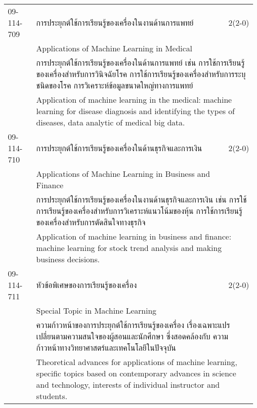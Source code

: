 \begin{longtable}{p{}p{}r{}}
09-114-709 & การประยุกต์ใช้การเรียนรู้ของเครื่องในงานด้านการแพทย์  & 2(2-0)\\*
 & Applications of Machine Learning in Medical & \phantom{x} \vspace{3mm} \\*
&  \multicolumn{2}{p{0.75\textwidth}}{การประยุกต์ใช้การเรียนรู้ของเครื่องในด้านการแพทย์ เช่น การใช้การเรียนรู้ของเครื่องสำหรับการวินิจฉัยโรค การใช้การเรียนรู้ของเครื่องสำหรับการระบุชนิดของโรค การวิเคราะห์ข้อมูลขนาดใหญ่ทางการแพทย์} \vspace{3mm} \\*
&  \multicolumn{2}{p{0.75\textwidth}}{Application of machine learning in the medical: machine learning for disease diagnosis and identifying the types of diseases, data analytic of medical big data.} \vspace{8mm} \\*
09-114-710 & การประยุกต์ใช้การเรียนรู้ของเครื่องในด้านธุรกิจและการเงิน & 2(2-0)\\*
 & Applications of Machine Learning in Business and Finance & \phantom{x} \vspace{3mm} \\*
&  \multicolumn{2}{p{0.75\textwidth}}{การประยุกต์ใช้การเรียนรู้ของเครื่องในงานด้านธุรกิจและการเงิน เช่น การใช้การเรียนรู้ของเครื่องสำหรับการวิเคราะห์แนวโน้มของหุ้น การใช้การเรียนรู้ของเครื่องสำหรับการตัดสินใจทางธุรกิจ} \vspace{3mm} \\*
&  \multicolumn{2}{p{0.75\textwidth}}{Application of machine learning in business and finance: machine learning for stock trend analysis and making business decisions.} \vspace{8mm} \\*
09-114-711 & หัวข้อพิเศษของการเรียนรู้ของเครื่อง  & 2(2-0)\\*
 & Special Topic in Machine Learning & \phantom{x} \vspace{3mm} \\*
&  \multicolumn{2}{p{0.75\textwidth}}{ความก้าวหน้าของการประยุกต์ใช้การเรียนรู้ของเครื่อง เรื่องเฉพาะแปรเปลี่ยนตามความสนใจของผู้สอนและนักศึกษา ซึ่งสอดคล้องกับ ความก้าวหน้าทางวิทยาศาสตร์และเทคโนโลยีในปัจจุบัน } \vspace{3mm} \\*
&  \multicolumn{2}{p{0.75\textwidth}}{Theoretical advances for applications of machine learning, specific topics based on contemporary advances in science and technology, interests of individual instructor and students.} \vspace{8mm} \\*

\end{longtable}
